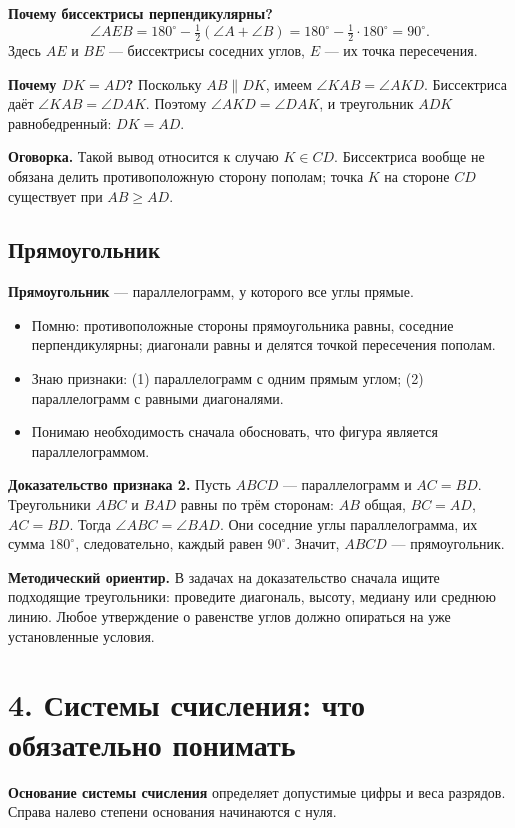 \documentclass[a4paper,12pt]{article}
\newcommand{\key}[1]{\textbf{\color{darkaccent}#1}}
\newcommand{\checkitem}[1]{\item[\(\square\)] #1}
\newenvironment{skills}{\begin{itemize}[label=\(\square\),leftmargin=*,itemsep=2pt]}{\end{itemize}}
\begin{document}
\textbf{Почему биссектрисы перпендикулярны?}
\[
\angle AEB=180^\circ-\tfrac12(\angle A+\angle B)
=180^\circ-\tfrac12\cdot180^\circ=90^\circ.
\]
Здесь \(AE\) и \(BE\) --- биссектрисы соседних углов, \(E\) --- их точка пересечения.

\textbf{Почему \(DK=AD\)?} Поскольку \(AB\parallel DK\), имеем \(\angle KAB=\angle AKD\). Биссектриса даёт \(\angle KAB=\angle DAK\). Поэтому \(\angle AKD=\angle DAK\), и треугольник \(ADK\) равнобедренный: \(DK=AD\).

\key{Оговорка.} Такой вывод относится к случаю \(K\in CD\). Биссектриса вообще не обязана делить противоположную сторону пополам; точка \(K\) на стороне \(CD\) существует при \(AB\ge AD\).

\subsection*{Прямоугольник}
\key{Прямоугольник} --- параллелограмм, у которого все углы прямые.

\begin{skills}
\checkitem{Помню: противоположные стороны прямоугольника равны, соседние перпендикулярны; диагонали равны и делятся точкой пересечения пополам.}
\checkitem{Знаю признаки: (1) параллелограмм с одним прямым углом; (2) параллелограмм с равными диагоналями.}
\checkitem{Понимаю необходимость сначала обосновать, что фигура является параллелограммом.}
\end{skills}

\textbf{Доказательство признака 2.} Пусть \(ABCD\) --- параллелограмм и \(AC=BD\). Треугольники \(ABC\) и \(BAD\) равны по трём сторонам: \(AB\) общая, \(BC=AD\), \(AC=BD\). Тогда \(\angle ABC=\angle BAD\). Они соседние углы параллелограмма, их сумма \(180^\circ\), следовательно, каждый равен \(90^\circ\). Значит, \(ABCD\) --- прямоугольник.

\key{Методический ориентир.} В задачах на доказательство сначала ищите подходящие треугольники: проведите диагональ, высоту, медиану или среднюю линию. Любое утверждение о равенстве углов должно опираться на уже установленные условия.

\clearpage
\section*{4. Системы счисления: что обязательно понимать}
\key{Основание системы счисления} определяет допустимые цифры и веса разрядов. Справа налево степени основания начинаются с нуля.
\end{document}
